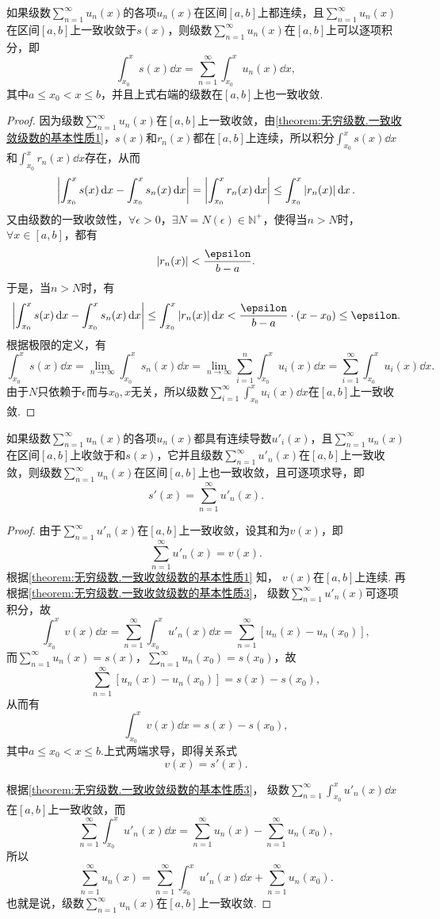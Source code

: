 \begin{property}\label{theorem:无穷级数.一致收敛级数的基本性质3}
\def\s{\sum\limits_{n=1}^\infty }
如果级数\(\s u_n(x)\)的各项\(u_n(x)\)在区间\([a,b]\)上都连续，且\(\s u_n(x)\)在区间\([a,b]\)上一致收敛于\(s(x)\)，则级数\(\s u_n(x)\)在\([a,b]\)上可以逐项积分，即\[
\int_{x_0}^x s(x) \dd{x}
= \s \int_{x_0}^x u_n(x) \dd{x},
\]其中\(a \leq x_0 < x \leq b\)，并且上式右端的级数在\([a,b]\)上也一致收敛.
\begin{proof}
因为级数\(\s u_n(x)\)在\([a,b]\)上一致收敛，由\cref{theorem:无穷级数.一致收敛级数的基本性质1}，\(s(x)\)和\(r_n(x)\)都在\([a,b]\)上连续，所以积分\(\int_{x_0}^x s(x) \dd{x}\)和\(\int_{x_0}^x r_n(x) \dd{x}\)存在，从而\[
\abs{\int_{x_0}^x s(x) \dd{x} - \int_{x_0}^x s_n(x) \dd{x}}
= \abs{\int_{x_0}^x r_n(x) \dd{x}}
\leq \int_{x_0}^x \abs{r_n(x)} \dd{x}.
\]又由级数的一致收敛性，\(\forall\epsilon>0\)，\(\exists N = N(\epsilon) \in \mathbb{N}^+\)，使得当\(n > N\)时，\(\forall x \in [a,b]\)，都有\[
\abs{r_n(x)} < \frac{\epsilon}{b-a}.
\]于是，当\(n > N\)时，有\[
\abs{\int_{x_0}^x s(x) \dd{x} - \int_{x_0}^x s_n(x) \dd{x}}
\leq \int_{x_0}^x \abs{r_n(x)} \dd{x}
< \frac{\epsilon}{b-a} \cdot (x-x_0)
\leq \epsilon.
\]根据极限的定义，有\[
\int_{x_0}^x s(x) \dd{x}
= \lim\limits_{n\to\infty} \int_{x_0}^x s_n(x) \dd{x}
= \lim\limits_{n\to\infty} \sum\limits_{i=1}^n \int_{x_0}^x u_i(x) \dd{x}
= \sum\limits_{i=1}^\infty \int_{x_0}^x u_i(x) \dd{x}.
\]由于\(N\)只依赖于\(\epsilon\)而与\(x_0,x\)无关，所以级数\(\sum\limits_{i=1}^\infty \int_{x_0}^x u_i(x) \dd{x}\)在\([a,b]\)上一致收敛.
\end{proof}
\end{property}

\begin{property}\label{theorem:无穷级数.一致收敛级数的基本性质4}
\def\s{\sum\limits_{n=1}^\infty }
如果级数\(\s u_n(x)\)的各项\(u_n(x)\)都具有连续导数\(u'_i(x)\)，且\(\s u_n(x)\)在区间\([a,b]\)上收敛于和\(s(x)\)，它并且级数\(\s u'_n(x)\)在\([a,b]\)上一致收敛，则级数\(\s u_n(x)\)在区间\([a,b]\)上也一致收敛，且可逐项求导，即\[
s'(x) = \s u'_n(x).
\]
\begin{proof}
由于\(\s u'_n(x)\)在\([a,b]\)上一致收敛，设其和为\(v(x)\)，即\[
\s u'_n(x) = v(x).
\]
根据\cref{theorem:无穷级数.一致收敛级数的基本性质1} 知，
\(v(x)\)在\([a,b]\)上连续.
再根据\cref{theorem:无穷级数.一致收敛级数的基本性质3}，
级数\(\s u'_n(x)\)可逐项积分，故\[
\int_{x_0}^x v(x) \dd{x}
= \s \int_{x_0}^x u'_n(x) \dd{x}
= \s [u_n(x) - u_n(x_0)],
\]
而\(\s u_n(x) = s(x)\)，\(\s u_n(x_0) = s(x_0)\)，故\[
\s [u_n(x) - u_n(x_0)] = s(x) - s(x_0),
\]
从而有\[
\int_{x_0}^x v(x) \dd{x} = s(x) - s(x_0),
\]
其中\(a \leq x_0 < x \leq b\).上式两端求导，即得关系式\[
v(x) = s'(x).
\]

根据\cref{theorem:无穷级数.一致收敛级数的基本性质3}，
级数\(\s \int_{x_0}^x u'_n(x) \dd{x}\)在\([a,b]\)上一致收敛，而\[
\s \int_{x_0}^x u'_n(x) \dd{x} = \s u_n(x) - \s u_n(x_0),
\]所以\[
\s u_n(x) = \s \int_{x_0}^x u'_n(x) \dd{x} + \s u_n(x_0).
\]也就是说，级数\(\s u_n(x)\)在\([a,b]\)上一致收敛.
\end{proof}
\end{property}

